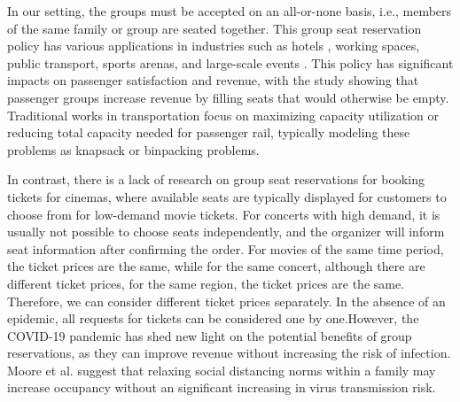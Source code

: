 


In our setting, the groups must be accepted on an all-or-none basis, i.e., members of the same family or group are seated together. 
This group seat reservation policy has various applications in industries such as hotels \cite{li2013modeling}, working spaces\cite{fischetti2021safe}, public transport\cite{deplano2019offline}, sports arenas\cite{kwag2022optimal}, and large-scale events \cite{lewis2016creating}. This policy has significant impacts on passenger satisfaction and revenue, with the study \cite{yuen2002group} showing that passenger groups increase revenue by filling seats that would otherwise be empty. Traditional works \cite{clausen2010off, deplano2019offline}in transportation focus on maximizing capacity utilization or reducing total capacity needed for passenger rail, typically modeling these problems as knapsack or binpacking problems.

In contrast, there is a lack of research on group seat reservations for booking tickets for cinemas, where available seats are typically displayed for customers to choose from for low-demand movie tickets. For concerts with high demand, it is usually not possible to choose seats independently, and the organizer will inform seat information after confirming the order. 
For movies of the same time period, the ticket prices are the same, while for the same concert, although there are different ticket prices, for the same region, the ticket prices are the same. Therefore, we can consider different ticket prices separately. 
In the absence of an epidemic, all requests for tickets can be considered one by one.However, the COVID-19 pandemic has shed new light on the potential benefits of group reservations, as they can improve revenue without increasing the risk of infection. Moore et al. \cite{moore2021seat} suggest that relaxing social distancing norms within a family may increase occupancy without an significant increasing in virus transmission risk.

